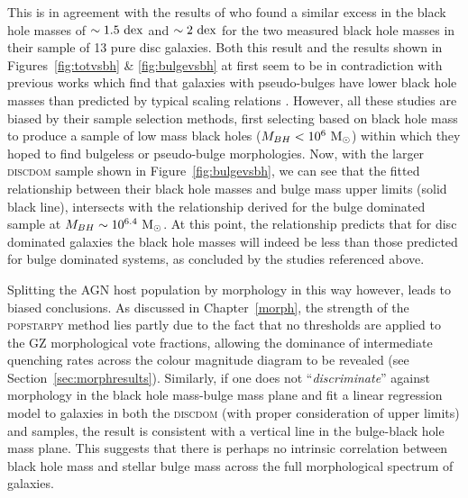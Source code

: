 {This is in agreement with the results of \citet{Simmons13} who found a similar excess in the black hole masses of $\sim 1.5~\rm{dex}$ and $\sim 2~\rm{dex}$ for the two measured black hole masses in their sample of 13 pure disc galaxies. Both this result and the results shown in Figures~\ref{fig:totvsbh} \& \ref{fig:bulgevsbh} at first seem to be in contradiction with previous works which find that galaxies with pseudo-bulges have lower black hole masses than predicted by typical scaling relations \citep[see work by][]{greene08, hu09, jiang11a, mathur12, ho14}. However, all these studies are biased by their sample selection methods, first selecting based on black hole mass to produce a sample of low mass black holes ($M_{BH} < 10^6 ~\rm{M}_{\odot}$) within which they hoped to find bulgeless or pseudo-bulge morphologies. Now, with the larger \textsc{discdom} sample shown in Figure~\ref{fig:bulgevsbh}, we can see that the fitted relationship between their black hole masses and bulge mass upper limits (solid black line), intersects with the relationship derived for the bulge dominated \citet{haringrix04} sample at $M_{BH} \sim 10^{6.4} ~\rm{M}_{\odot}$. At this point, the relationship predicts that for disc dominated galaxies the black hole masses will indeed be less than those predicted for bulge dominated systems, as concluded by the studies referenced above. 

Splitting the AGN host population by morphology in this way however, leads to biased conclusions. As discussed in Chapter~\ref{morph}, the strength of the \textsc{popstarpy} method lies partly due to the fact that no thresholds are applied to the GZ morphological vote fractions, allowing the dominance of intermediate quenching rates across the colour magnitude diagram to be revealed (see Section~\ref{sec:morphresults}). Similarly, if one does not ``\emph{discriminate}'' against morphology in the black hole mass-bulge mass plane and fit a linear regression model to galaxies in both the \textsc{discdom} (with proper consideration of upper limits) and \citet{haringrix04} samples, the result is consistent with a vertical line in the bulge-black hole mass plane. This suggests that there is perhaps no intrinsic correlation between black hole mass and stellar bulge mass across the full morphological spectrum of galaxies. 

}
